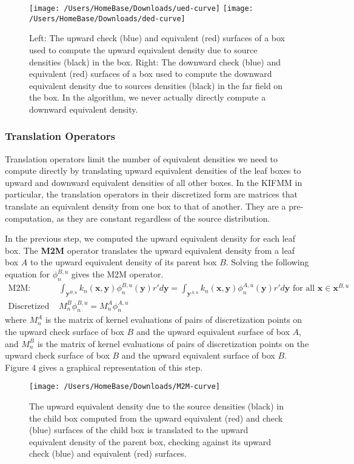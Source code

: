\documentclass[12pt,letterpaper]{article}
\begin{document}
\begin{figure}[!ht]
\begin{center}
\texttt{[image: /Users/HomeBase/Downloads/ued-curve]}
\texttt{[image: /Users/HomeBase/Downloads/ded-curve]}
\end{center}
\caption{Left: The upward check (blue) and equivalent (red) surfaces of a box used to compute the upward equivalent density due to source densities (black) in the box. Right: The downward check (blue) and equivalent (red) surfaces of a box used to compute the downward equivalent density due to sources densities (black) in the far field on the box. In the algorithm, we never actually directly compute a downward equivalent density.}
\end{figure}

\subsubsection{Translation Operators}

Translation operators limit the number of equivalent densities we need to compute directly by translating upward equivalent densities of the leaf boxes to upward and downward equivalent densities of all other boxes. In the KIFMM in particular, the translation operators in their discretized form are matrices that translate an equivalent density from one box to that of another. They are a pre-computation, as they are constant regardless of the source distribution.

In the previous step, we computed the upward equivalent density for each leaf box. The \textbf{M2M} operator translates the upward equivalent density from a leaf box $A$ to the upward equivalent density of its parent box $B$. Solving the following equation for $\phi_n^{B,u}$ gives the M2M operator.
\begin{align}
\mbox{M2M: }&\int_{\mathbf{y}^{B,u}}{k_n(\mathbf{x},\mathbf{y})}\phi^{B,u}_n{(\mathbf{y})}r'd\mathbf{y} = \int_{\mathbf{y}^{A,u}}{k_n(\mathbf{x},\mathbf{y})}\phi^{A,u}_n{(\mathbf{y})}r'd\mathbf{y}\mbox{ for all }\mathbf{x}\in\mathbf{x}^{B,u}\\
\mbox{Discretized M2M: }&M_n^B\phi^{B,u}_n=M_n^A\phi^{A,u}_n
\end{align}
where $M_n^A$ is the matrix of kernel evaluations of pairs of discretization points on the upward check surface of box $B$ and the upward equivalent surface of box $A$, and $M_n^B$ is the matrix of kernel evaluations of pairs of discretization points on the upward check surface of box $B$ and the upward equivalent surface of box $B$. Figure 4 gives a graphical representation of this step.
\begin{figure}[!ht]
\begin{center}
\texttt{[image: /Users/HomeBase/Downloads/M2M-curve]}
\end{center}
\caption{The upward equivalent density due to the source densities (black) in the child box computed from the upward equivalent (red) and check (blue) surfaces of the child box is translated to the upward equivalent density of the parent box, checking against its upward check (blue) and equivalent (red) surfaces.}
\end{figure}
\end{document}
